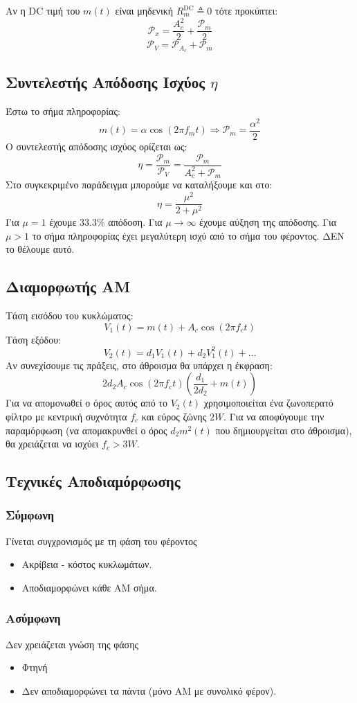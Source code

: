 \documentclass[a4paper,12pt]{article}
\begin{document}
Αν η DC τιμή του \(m(t)\) είναι μηδενική \(R_m^{\text{DC}} \triangleq 0\) τότε προκύπτει:
\[
\mathcal{P}_x=\frac{A_c^2}{2} + \frac{\mathcal{P}_m}{2}
\]
\[
\mathcal{P}_V=\mathcal{P}_{A_c}+\mathcal{P}_m
\]

\subsection*{Συντελεστής Απόδοσης Ισχύος \(\eta\)}
Έστω το σήμα πληροφορίας:
\[
m(t)=\alpha \cos(2\pi f_m t) \Rightarrow \mathcal{P}_m = \frac{\alpha^2}{2}
\]
Ο συντελεστής απόδοσης ισχύος ορίζεται ως:
\[
\eta = \frac{\mathcal{P}_m}{\mathcal{P}_V}=\frac{\mathcal{P}_m}{A_c^2 + \mathcal{P}_m}
\]
Στο συγκεκριμένο παράδειγμα μπορούμε να καταλήξουμε και στο:
\[
\eta = \frac{\mu^2}{2+\mu^2}
\]
Για \(\mu = 1\) έχουμε \(33.3\%\) απόδοση. Για \(\mu \rightarrow \infty\) έχουμε αύξηση της απόδοσης. Για \(\mu >1\) το σήμα πληροφορίας έχει μεγαλύτερη ισχύ από το σήμα του φέροντος. ΔΕΝ το θέλουμε αυτό.

\subsection*{Διαμορφωτής AM}
Τάση εισόδου του κυκλώματος:
\[
V_1(t)=m(t)+A_c \cos(2 \pi f_c t)
\]
Τάση εξόδου:
\[
V_2(t)=d_1 V_1(t)+d_2 V_1^2(t)+...
\]
Αν συνεχίσουμε τις πράξεις, στο άθροισμα θα υπάρχει η έκφραση:
\[
2d_2A_c \cos(2\pi f_c t)\left(\frac{d_1}{2d_2} + m(t) \right)
\]
Για να απομονωθεί ο όρος αυτός από το \(V_2(t)\) χρησιμοποιείται ένα ζωνοπερατό φίλτρο με κεντρική συχνότητα \(f_c\) και εύρος ζώνης \(2W\). Για να αποφύγουμε την παραμόρφωση (να απομακρυνθεί ο όρος \(d_2 m^2(t)\) που δημιουργείται στο άθροισμα), θα χρειάζεται να ισχύει \(f_c>3W\).

\subsection*{Τεχνικές Αποδιαμόρφωσης}
\subsubsection*{Σύμφωνη}
Γίνεται συγχρονισμός με τη φάση του φέροντος
\begin{itemize}
\item Ακρίβεια - κόστος κυκλωμάτων.
\item Αποδιαμορφώνει κάθε AM σήμα.
\end{itemize}

\subsubsection*{Ασύμφωνη}
Δεν χρειάζεται γνώση της φάσης
\begin{itemize}
\item Φτηνή
\item Δεν αποδιαμορφώνει τα πάντα (μόνο AM με συνολικό φέρον).
\end{itemize}
\end{document}
